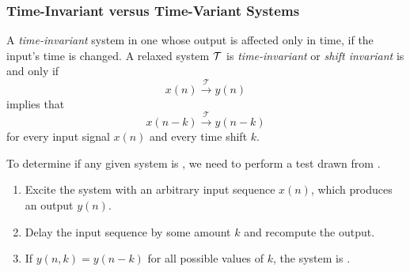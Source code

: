 \subsubsection{Time-Invariant versus Time-Variant Systems}\label{subsubsec:Time-Invariant_vs_Time-Variant_Systems}
\begin{definition}\label{def:Time_Invariant}
  A \emph{time-invariant} system in one whose output is affected only in time, if the input's time is changed.
  A relaxed system $\operatorname{\mathcal{T}}$ is \emph{time-invariant} or \emph{shift invariant} is and only if
  \begin{equation*}
    x(n) \overset{\mathcal{T}}{\longrightarrow} y(n)
  \end{equation*}
  implies that
  \begin{equation*}
    x(n-k) \overset{\mathcal{T}}{\longrightarrow} y(n-k)
  \end{equation*}
  for every input signal $x(n)$ and every time shift $k$.
\end{definition}

To determine if any given system is , we need to perform a test drawn from .
\begin{enumerate}[noitemsep]
\item Excite the system with an arbitrary input sequence $x(n)$, which produces an output $y(n)$.
\item Delay the input sequence by some amount $k$ and recompute the output.
\item If $y(n,k) = y(n-k)$ for all possible values of $k$, the system is .
\end{enumerate}

